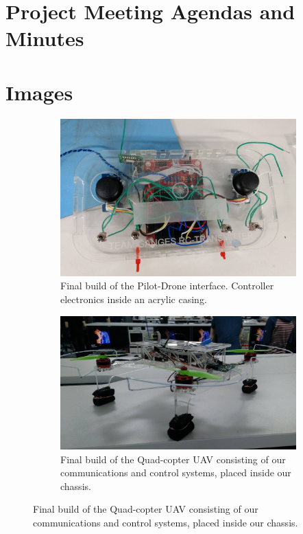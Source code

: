 \documentclass[a4paper,11pt]{article}
\begin{document}
\newpage
\section{Project Meeting Agendas and Minutes}

\newpage
\section{Images}
\begin{figure}[ht]
\caption{Final product images}
    \begin{subfigure}{\textwidth}
    \includegraphics[width=0.9\linewidth]{remote.jpg} 
    \caption{Final build of the Pilot-Drone interface. Controller electronics inside an acrylic casing.}
    \label{fig:subim1}
    \end{subfigure}
    \begin{subfigure}{\textwidth}
    \includegraphics[width=0.9\linewidth]{drone.jpg}
    \caption{Final build of the Quad-copter UAV consisting of our communications and control systems, placed inside our chassis.}
    \label{fig:subim2}
    \end{subfigure}
    
    \label{fig:my_label}
\end{figure}
  
\end{document}
